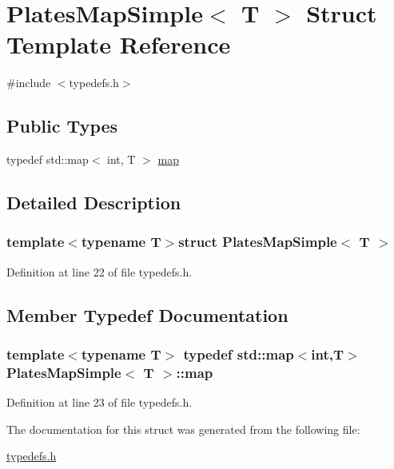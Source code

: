\hypertarget{struct_plates_map_simple}{\section{Plates\-Map\-Simple$<$ T $>$ Struct Template Reference}
\label{struct_plates_map_simple}
}


{\ttfamily \#include $<$typedefs.\-h$>$}

\subsection*{Public Types}
\begin{DoxyCompactItemize}
\item 
typedef std\-::map$<$ int, T $>$ \hyperlink{struct_plates_map_simple_a85cc0dfd357a452fe14fc06e81e8b154}{map}
\end{DoxyCompactItemize}


\subsection{Detailed Description}
\subsubsection*{template$<$typename T$>$struct Plates\-Map\-Simple$<$ T $>$}



Definition at line 22 of file typedefs.\-h.



\subsection{Member Typedef Documentation}
\hypertarget{struct_plates_map_simple_a85cc0dfd357a452fe14fc06e81e8b154}{
\subsubsection[{map}]{\setlength{\rightskip}{0pt plus 5cm}template$<$typename T$>$ typedef std\-::map$<$int,T$>$ {\bf Plates\-Map\-Simple}$<$ T $>$\-::{\bf map}}}\label{struct_plates_map_simple_a85cc0dfd357a452fe14fc06e81e8b154}


Definition at line 23 of file typedefs.\-h.



The documentation for this struct was generated from the following file\-:\begin{DoxyCompactItemize}
\item 
\hyperlink{typedefs_8h}{typedefs.\-h}\end{DoxyCompactItemize}
